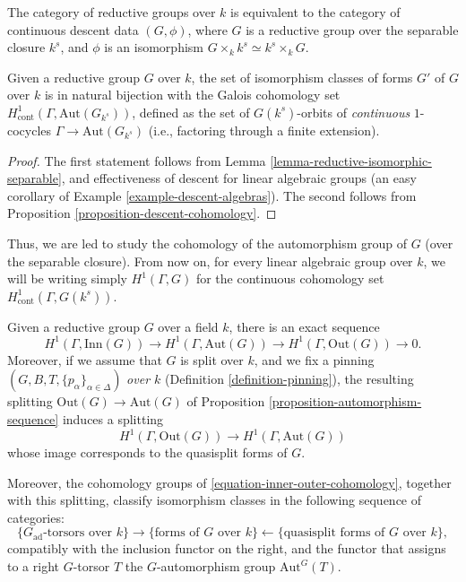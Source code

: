 \begin{proposition}
\label{proposition-forms-by-descent}
 The category of reductive groups over $k$ is equivalent to the category of continuous descent data $(G, \phi)$, where $G$ is a reductive group over the separable closure $k^s$, and $\phi$ is an isomorphism $G\times_k k^s\simeq k^s\times_k G$. 
 
 Given a reductive group $G$ over $k$, the set of isomorphism classes of forms $G'$ of $G$ over $k$ is in natural bijection with the Galois cohomology set $H^1_{\text{cont}}(\Gamma, \text{Aut}(G_{k^s}))$, defined as the set of $G(k^s)$-orbits of \emph{continuous} $1$-cocycles $\Gamma\to \text{Aut}(G_{k^s})$ (i.e., factoring through a finite extension). 
\end{proposition}

\begin{proof}
 The first statement follows from Lemma \ref{lemma-reductive-isomorphic-separable}, and effectiveness of descent for linear algebraic groups (an easy corollary of Example \ref{example-descent-algebras}). The second follows from Proposition \ref{proposition-descent-cohomology}. 
\end{proof}

Thus, we are led to study the cohomology of the automorphism group of $G$ (over the separable closure). From now on, for every linear algebraic group over $k$, we will be writing simply $H^1(\Gamma, G)$ for the continuous cohomology set $H^1_{\text{cont}}(\Gamma, G(k^s))$. 

\begin{proposition}
 \label{proposition-inner-outer-cohomology}
Given a reductive group $G$ over a field $k$, there is an exact sequence
\begin{equation}
\label{equation-inner-outer-cohomology}
 H^1(\Gamma, \text{Inn}(G)) \to H^1(\Gamma, \text{Aut}(G)) \to H^1(\Gamma, \text{Out}(G)) \to 0.
\end{equation}
Moreover, if we assume that $G$ is split over $k$, and we fix a pinning $(G, B, T, \{p_\alpha\}_{\alpha\in\Delta})$ \emph{over $k$} (Definition \ref{definition-pinning}), the resulting splitting $\text{Out}(G)\to \text{Aut}(G)$ of Proposition \ref{proposition-automorphism-sequence} induces a splitting
$$  H^1(\Gamma, \text{Out}(G)) \to H^1(\Gamma, \text{Aut}(G))$$
whose image corresponds to the quasisplit forms of $G$. 

Moreover, the cohomology groups of \eqref{equation-inner-outer-cohomology}, together with this splitting, classify isomorphism classes in the following sequence of categories:
$$ \{\mbox{$G_{\text{ad}}$-torsors over $k$}\} \to \{\mbox{forms of $G$ over $k$}\} \leftarrow \{\mbox{quasisplit forms of $G$ over $k$}\},$$
compatibly with the inclusion functor on the right, and the functor that assigns to a right $G$-torsor $T$ the $G$-automorphism group $\text{Aut}^G(T)$.
\end{proposition}


